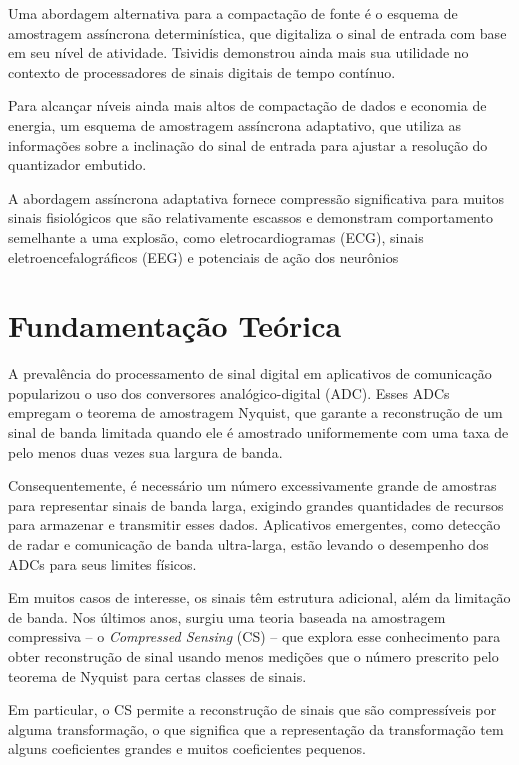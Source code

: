\documentclass[a4paper, 12pt]{article}
\begin{document}
Uma abordagem alternativa para a compactação de fonte é o esquema de amostragem assíncrona determinística, que digitaliza o sinal de entrada com base em seu nível de atividade. Tsividis \cite{tsividis1986continuous} demonstrou ainda mais sua utilidade no contexto de processadores de sinais digitais de tempo contínuo. 

Para alcançar níveis ainda mais altos de compactação de dados e economia de energia, um esquema de amostragem assíncrona adaptativo, que utiliza as informações sobre a inclinação do sinal de entrada para ajustar a resolução do quantizador embutido.

A abordagem assíncrona adaptativa fornece compressão significativa para muitos sinais fisiológicos que são relativamente escassos e demonstram comportamento semelhante a uma explosão, como eletrocardiogramas (ECG), sinais eletroencefalográficos (EEG) e potenciais de ação dos neurônios

\section{Fundamentação Teórica}

A prevalência do processamento de sinal digital em aplicativos de comunicação popularizou o uso dos conversores analógico-digital (ADC). Esses ADCs empregam o teorema de amostragem Nyquist, que garante a reconstrução de um sinal de banda limitada quando ele é amostrado uniformemente com uma taxa de pelo menos duas vezes sua largura de banda.

Consequentemente, é necessário um número excessivamente grande de amostras para representar sinais de banda larga, exigindo grandes quantidades de recursos para armazenar e transmitir esses dados. Aplicativos emergentes, como detecção de radar e comunicação de banda ultra-larga, estão levando o desempenho dos ADCs para seus limites físicos.

Em muitos casos de interesse, os sinais têm estrutura adicional, além da limitação de banda. Nos últimos anos, surgiu uma teoria baseada na amostragem compressiva -- o \textit{Compressed Sensing} (CS) -- que explora esse conhecimento para obter reconstrução de sinal usando menos medições que o número prescrito pelo teorema de Nyquist para certas classes de sinais. 

Em particular, o CS permite a reconstrução de sinais que são compressíveis por alguma transformação, o que significa que a representação da transformação tem alguns coeficientes grandes e muitos coeficientes pequenos.
\end{document}
